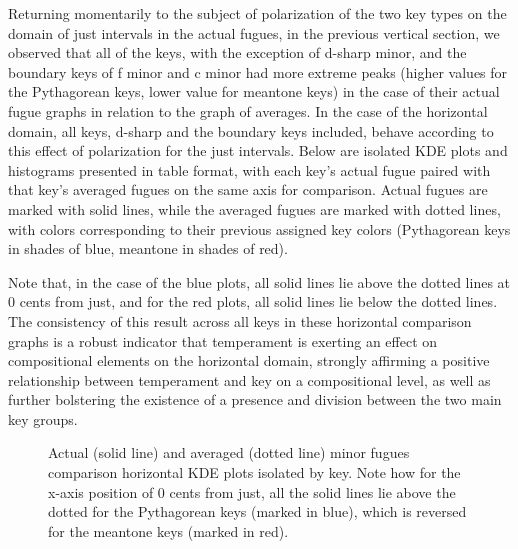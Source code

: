 Returning momentarily to the subject of polarization of the two key
types on the domain of just intervals in the actual fugues, in the
previous vertical section, we observed that all of the keys, with the
exception of d-sharp minor, and the boundary keys of f minor and c minor
had more extreme peaks (higher values for the Pythagorean keys, lower
value for meantone keys) in the case of their actual fugue graphs in
relation to the graph of averages. In the case of the horizontal domain,
all keys, d-sharp and the boundary keys included, behave according to
this effect of polarization for the just intervals. Below are isolated
KDE plots and histograms presented in table format, with each key's
actual fugue paired with that key's averaged fugues on the same axis for
comparison. Actual fugues are marked with solid lines, while the
averaged fugues are marked with dotted lines, with colors corresponding
to their previous assigned key colors (Pythagorean keys in shades of
blue, meantone in shades of red).

Note that, in the case of the blue plots, all solid lines lie above the
dotted lines at 0 cents from just, and for the red plots, all solid
lines lie below the dotted lines. The consistency of this result across
all keys in these horizontal comparison graphs is a robust indicator
that temperament is exerting an effect on compositional elements on the
horizontal domain, strongly affirming a positive relationship between
temperament and key on a compositional level, as well as further
bolstering the existence of a presence and division between the two main
key groups.




\begin{figure}[H]
\vspace{1.5em}
    \centering
    \caption[Actual and Averaged Minor Fugues Comparison Horizontal KDE Plots Isolated by Key. ]{Actual (solid line) and averaged (dotted line) minor fugues comparison horizontal KDE plots isolated by key. Note how for the x-axis position of 0 cents from just, all the solid lines lie above the dotted for the Pythagorean keys (marked in blue), which is reversed for the meantone keys (marked in red).}
\end{figure}


